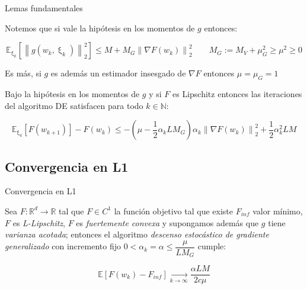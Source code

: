 \documentclass{beamer}
\newcommand{\R}{{\mathbb{R}}}
\newcommand{\N}{{\mathbb{N}}}
\newcommand{\norm}[1]{\left\lVert#1\right\rVert}
\newcommand{\expectation}[1]{\mathbb{E} \left[#1\right]}
\newcommand{\expectationsub}[2]{\mathbb{E}_{#1} \left[#2\right]}
\newcommand{\expectationchik}[1]{\expectationsub{\upxi_{k}}{#1}}
\newcommand{\underlimitinf}[1]{\xrightarrow[#1 \rightarrow \infty]{}}
\begin{document}
\begin{frame}{Lemas fundamentales}

	Notemos que si vale la hip\'otesis en los momentos de $g$ entonces:
	
	\begin{equation*}
	\expectationchik{\norm{g(w_k, \upxi_{k})}_2^2} \leq M + M_G\norm{\nabla F(w_k)}_2^2  \qquad M_G:= M_V + \mu_G^2 \geq \mu^2 \geq 0
	\end{equation*}

Es m\'as, si $g$ es adem\'as un estimador insesgado de $\nabla F$ entonces $\mu = \mu_G = 1$

\bigskip
\pause

\begin{lemma}
	Bajo la hip\'otesis en los momentos de $g$ y si $F$ es Lipschitz entonces las iteraciones del algoritmo DE satisfacen para todo $k \in \N$:
	
	\begin{subequations}
		\begin{equation*}
		\expectationchik{F(w_{k+1})} - F(w_k) \leq - \left( \mu - \frac{1}{2} \alpha_k L M_G \right)\alpha_k \norm{\nabla F(w_k)}_2^2 + \frac{1}{2} \alpha_k^2 L M
		\end{equation*}
	\end{subequations}
	
\end{lemma}

\end{frame}

\subsection{Convergencia en L1}

\begin{frame}{Convergencia en L1}
\begin{theorem}
	Sea $F: \R^d \rightarrow \R$ tal que $F \in C^1$ la funci\'on objetivo tal que existe $F_{inf}$ valor m\'inimo, $F$ es \textit{L-Lipschitz}, $F$ es \textit{fuertemente convexa} y supongamos adem\'as que $g$ tiene \textit{varianza acotada}; entonces el algoritmo \textit{descenso estoc\'astico de gradiente generalizado} con incremento fijo $0  <  \alpha_k = \alpha \leq \dfrac{\mu}{LM_G}$ cumple:
	
	\begin{equation*}
	\expectation{F(w_k) - F_{inf}} \underlimitinf{k} \dfrac{\alpha LM}{2 c \mu}
	\end{equation*}
	
\end{theorem}

\end{frame}
\end{document}
